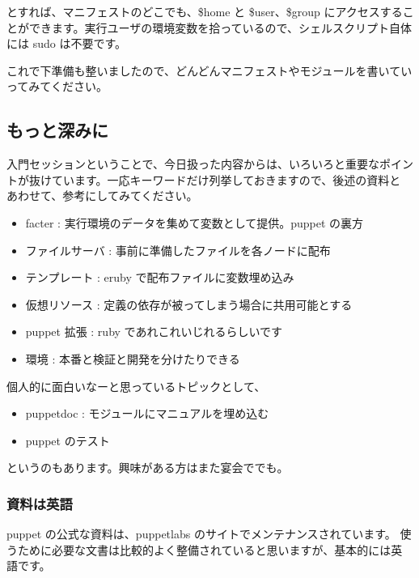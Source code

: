 \documentclass[mingoth,a4paper]{jsarticle}
\begin{document}
とすれば、マニフェストのどこでも、\$home と \$user、\$group にアクセスすることができます。実行ユーザの環境変数を拾っているので、シェルスクリプト自体には sudo は不要です。

これで下準備も整いましたので、どんどんマニフェストやモジュールを書いていってみてください。


\subsection{もっと深みに}

入門セッションということで、今日扱った内容からは、いろいろと重要なポイン
トが抜けています。一応キーワードだけ列挙しておきますので、後述の資料と
あわせて、参考にしてみてください。

\begin{itemize}
 \item facter : 実行環境のデータを集めて変数として提供。puppet の裏方
 \item ファイルサーバ : 事前に準備したファイルを各ノードに配布
 \item テンプレート : eruby で配布ファイルに変数埋め込み
 \item 仮想リソース : 定義の依存が被ってしまう場合に共用可能とする
 \item puppet 拡張 : ruby であれこれいじれるらしいです
 \item 環境 : 本番と検証と開発を分けたりできる
\end{itemize}

個人的に面白いなーと思っているトピックとして、

\begin{itemize}
 \item puppetdoc : モジュールにマニュアルを埋め込む
 \item puppet のテスト
\end{itemize}

というのもあります。興味がある方はまた宴会ででも。


\subsubsection{資料は英語}

puppet の公式な資料は、puppetlabs のサイトでメンテナンスされています。
使うために必要な文書は比較的よく整備されていると思いますが、基本的には英
語です。
\end{document}
